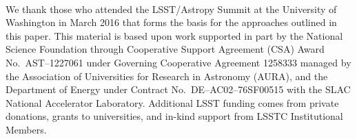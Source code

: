 \documentclass[]{spie}  %
\begin{document}
\acknowledgments\

We thank those who attended the LSST/Astropy Summit at the University of Washington in March 2016 that forms the basis for the approaches outlined in this paper.
This material is based upon work supported in part by the National Science Foundation through Cooperative Support Agreement (CSA) Award No.\ AST--1227061 under Governing Cooperative Agreement 1258333 managed by the Association of Universities for Research in Astronomy (AURA), and the Department of Energy under Contract No.\ DE--AC02--76SF00515 with the SLAC National Accelerator Laboratory.
Additional LSST funding comes from private donations, grants to universities, and in-kind support from LSSTC Institutional Members.

\end{document}
